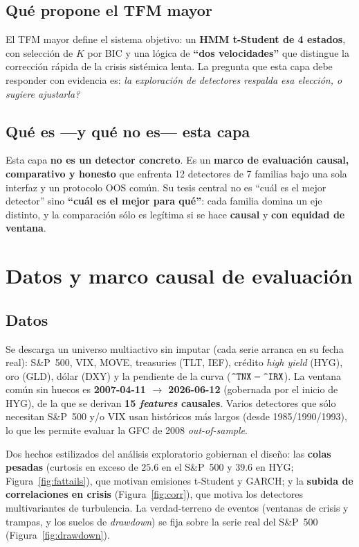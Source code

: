 \documentclass[11pt,a4paper]{article}
\newcommand{\code}[1]{\texttt{\detokenize{#1}}}
\begin{document}
\subsection{Qu\'e propone el TFM mayor}
El TFM mayor define el sistema objetivo: un \textbf{HMM t-Student de 4 estados}, con
selecci\'on de $K$ por BIC y una l\'ogica de \textbf{``dos velocidades''} que distingue la
correcci\'on r\'apida de la crisis sist\'emica lenta. La pregunta que esta capa debe
responder con evidencia es: \emph{\textquestiondown la exploraci\'on de detectores respalda esa elecci\'on,
o sugiere ajustarla?}

\subsection{Qu\'e es ---y qu\'e no es--- esta capa}
Esta capa \textbf{no es un detector concreto}. Es un \textbf{marco de evaluaci\'on causal,
comparativo y honesto} que enfrenta 12 detectores de 7 familias bajo una sola interfaz y un
protocolo OOS com\'un. Su tesis central no es ``cu\'al es el mejor detector'' sino
\textbf{``cu\'al es el mejor para qu\'e''}: cada familia domina un eje distinto, y la
comparaci\'on s\'olo es leg\'itima si se hace \textbf{causal} y \textbf{con equidad de
ventana}.

\section{Datos y marco causal de evaluaci\'on}

\subsection{Datos}
Se descarga un universo multiactivo sin imputar (cada serie arranca en su fecha real):
S\&P~500, VIX, MOVE, treasuries (TLT, IEF), cr\'edito \emph{high yield} (HYG), oro (GLD),
d\'olar (DXY) y la pendiente de la curva ($\code{^TNX}-\code{^IRX}$). La ventana com\'un
sin huecos es \textbf{2007-04-11 $\to$ 2026-06-12} (gobernada por el inicio de HYG), de la
que se derivan \textbf{15 \emph{features} causales}. Varios detectores que s\'olo necesitan
S\&P~500 y/o VIX usan hist\'oricos m\'as largos (desde 1985/1990/1993), lo que les permite
evaluar la GFC de 2008 \emph{out-of-sample}.

Dos hechos estilizados del an\'alisis exploratorio gobiernan el dise\~no: las
\textbf{colas pesadas} (curtosis en exceso de $25.6$ en el S\&P~500 y $39.6$ en HYG;
Figura~\ref{fig:fattails}), que motivan emisiones t-Student y GARCH; y la \textbf{subida de
correlaciones en crisis} (Figura~\ref{fig:corr}), que motiva los detectores multivariantes
de turbulencia. La verdad-terreno de eventos (ventanas de crisis y trampas, y los suelos de
\emph{drawdown}) se fija sobre la serie real del S\&P~500 (Figura~\ref{fig:drawdown}).
\end{document}

